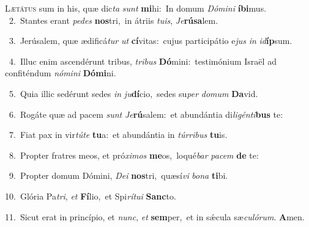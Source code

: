 \lettrine{\initial\textcolor{\initialcolor}{L}}{ætátus} sum in his, quæ dic\textit{ta} \textit{sunt} \textbf{mi}\-hi:~\star In domum \textit{Dó}\-\textit{mi}\textit{ni} \textbf{í}\-\textbf{bi}mus.\\
{\numbfont\textcolor{\numbcolor}{~2.}}~Stantes erant \textit{pe}\-\textit{des} \textbf{nos}\-tri,~\star in átriis \textit{tu}\-\textit{is}, \textit{Je}\-\textbf{rú}\textbf{sa}lem.\par
{\numbfont\textcolor{\numbcolor}{~3.}}~Jerúsalem, quæ ædificá\textit{tur} \textit{ut} \textbf{cí}\-vitas:~\star cujus participátio e\textit{jus} \textit{in} \textit{id}\-\textbf{íp}sum.\par
{\numbfont\textcolor{\numbcolor}{~4.}}~Illuc enim ascendérunt tribus, \textit{tri}\-\textit{bus} \textbf{Dó}\-mini:~\star testimónium Israël ad confiténdum \textit{nó}\-\textit{mi}\textit{ni} \textbf{Dó}\-\textbf{mi}ni.\par
{\numbfont\textcolor{\numbcolor}{~5.}}~Quia illic sedérunt sedes \textit{in} \textit{ju}\-\textbf{dí}cio,~\star sedes su\textit{per} \textit{do}\-\textit{mum} \textbf{Da}\-vid.\par
{\numbfont\textcolor{\numbcolor}{~6.}}~Rogáte quæ ad pacem \textit{sunt} \textit{Je}\-\textbf{rú}salem:~\star et abundántia di\-\textit{li}\-\textit{gén}\textit{ti}\textbf{bus} te:\par
{\numbfont\textcolor{\numbcolor}{~7.}}~Fiat pax in vir\-\textit{tú}\-\textit{te} \textbf{tu}\-a:~\star et abundántia in \textit{túr}\-\textit{ri}\textit{bus} \textbf{tu}\-is.\par
{\numbfont\textcolor{\numbcolor}{~8.}}~Propter fratres meos, et pró\-\textit{xi}\-\textit{mos} \textbf{me}\-os,~\star loqué\textit{bar} \textit{pa}\-\textit{cem} \textbf{de} te:\par
{\numbfont\textcolor{\numbcolor}{~9.}}~Propter domum Dómini, \textit{De}\-\textit{i} \textbf{nos}\-tri,~\star quæsí\textit{vi} \textit{bo}\-\textit{na} \textbf{ti}\-bi.\par
{\numbfont\textcolor{\numbcolor}{10.}}~Glória Pa\-\textit{tri}\-, \textit{et} \textbf{Fí}\-lio,~\star et Spi\-\textit{rí}\-\textit{tu}\textit{i} \textbf{Sanc}\-to.\par
{\numbfont\textcolor{\numbcolor}{11.}}~Sicut erat in princípio, et \textit{nunc}\-, \textit{et} \textbf{sem}\-per,~\star et in sǽcula sæ\-\textit{cu}\-\textit{ló}\textit{rum}. \textbf{A}\-men.\par
